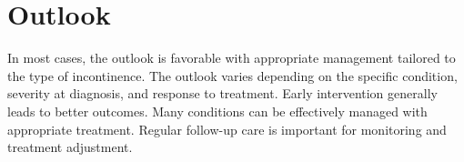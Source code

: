 \section{Outlook}
In most cases, the outlook is favorable with appropriate management tailored to the type of incontinence. The outlook varies depending on the specific condition, severity at diagnosis, and response to treatment. Early intervention generally leads to better outcomes. Many conditions can be effectively managed with appropriate treatment. Regular follow-up care is important for monitoring and treatment adjustment.
